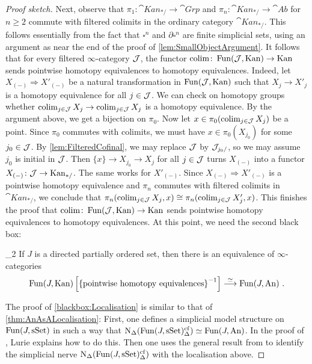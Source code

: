 \begin{proof}[Proof sketch]
	Next, observe that $\pi_1\colon \cat{Kan}_{*/}\rightarrow\cat{Grp}$ and $\pi_n\colon \cat{Kan}_{*/}\rightarrow \cat{Ab}$ for $n\geqslant 2$ commute with filtered colimits in the ordinary category $\cat{Kan}_{*/}$. This follows essentially from the fact that $\square^n$ and $\partial\square^n$ are finite simplicial sets, using an argument as near the end of the proof of \cref{lem:SmallObjectArgument}. It follows that for every filtered $\infty$-category $\mathcal{J}$, the functor $\operatorname*{colim}\colon \operatorname{Fun}(\mathcal{J},\mathrm{Kan})\rightarrow\mathrm{Kan}$ sends pointwise homotopy equivalences to homotopy equivalences. Indeed, let $X_{(-)}\Rightarrow X'_{(-)}$ be a natural transformation in $\operatorname{Fun}(\mathcal{J},\mathrm{Kan})$ such that $X_j\rightarrow X'_j$ is a homotopy equivalence for all $j\in\mathcal{J}$. We can check on homotopy groups whether $\operatorname*{colim}_{j\in\mathcal{J}}X_j\rightarrow\operatorname*{colim}_{j\in\mathcal{J}}X_j$ is a homotopy equivalence. By the argument above, we get a bijection on $\pi_0$. Now let $x\in \pi_0(\operatorname*{colim}_{j\in\mathcal{J}}X_j)$ be a point. Since $\pi_0$ commutes with colimits, we must have $x\in \pi_0(X_{j_0})$ for some $j_0\in \mathcal{J}$. By \cref{lem:FilteredCofinal}, we may replace $\mathcal{J}$ by $\mathcal{J}_{j_0/}$, so we may assume $j_0$ is initial in $\mathcal{J}$. Then $\{x\}\rightarrow X_{j_0}\rightarrow X_j$ for all $j\in \mathcal{J}$ turns $X_{(-)}$ into a functor $X_{(-)}\colon \mathcal{J}\rightarrow\mathrm{Kan}_{*/}$. The same works for $X'_{(-)}$. Since $X_{(-)}\Rightarrow X'_{(-)}$ is a pointwise homotopy equivalence and $\pi_n$ commutes with filtered colimits in $\cat{Kan}_{*/}$, we conclude that $\pi_n(\operatorname*{colim}_{j\in\mathcal{J}}X_j,x)\cong \pi_n(\operatorname*{colim}_{j\in\mathcal{J}}X_j',x)$. This finishes the proof that $\operatorname*{colim}\colon \operatorname{Fun}(\mathcal{J},\mathrm{Kan})\rightarrow\mathrm{Kan}$ sends pointwise homotopy equivalences to homotopy equivalences. At this point, we need the second black box:
	\begin{alphanumerate}\itshape
		\item[\blacksquare_2] If $J$ is a directed partially ordered set, then there is an equivalence of $\infty$-categories\label{blackbox:Localisation}
		\begin{equation*}
			\operatorname{Fun}\!\left(J,\mathrm{Kan}\right)\left[\left\{\text{pointwise homotopy equivalences}\right\}^{-1}\right]\overset{\simeq}{\longrightarrow}\operatorname{Fun}\!\left(J,\mathrm{An}\right)\,.
		\end{equation*}
	\end{alphanumerate}
	The proof of \cref{blackbox:Localisation} is similar to that of \cref{thm:AnAsALocalisation}: First, one defines a simplicial model structure on $\operatorname{Fun}(J,\mathrm{sSet})$ in such a way that $\operatorname{N}_\Delta(\operatorname{Fun}(J,\mathrm{sSet})_\Delta^\mathrm{cf})\simeq \operatorname{Fun}(J,\mathrm{An})$.  
	In the proof of \cite[Proposition~]{HTT}, Lurie explains how to do this. Then one uses the general result from \cite[Theorem~]{HA} to identify the simplicial nerve $\operatorname{N}_\Delta(\operatorname{Fun}(J,\mathrm{sSet})_\Delta^\mathrm{cf})$ with the localisation above.
	

\end{proof}
